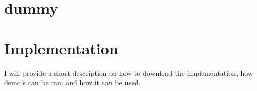 \documentclass[]{report}
\begin{document}
\appendix
\chapter{dummy}

\chapter{Implementation}

I will provide a short description on how to download the implementation, how demo's can be ran, and how it can be used.


\end{document}
